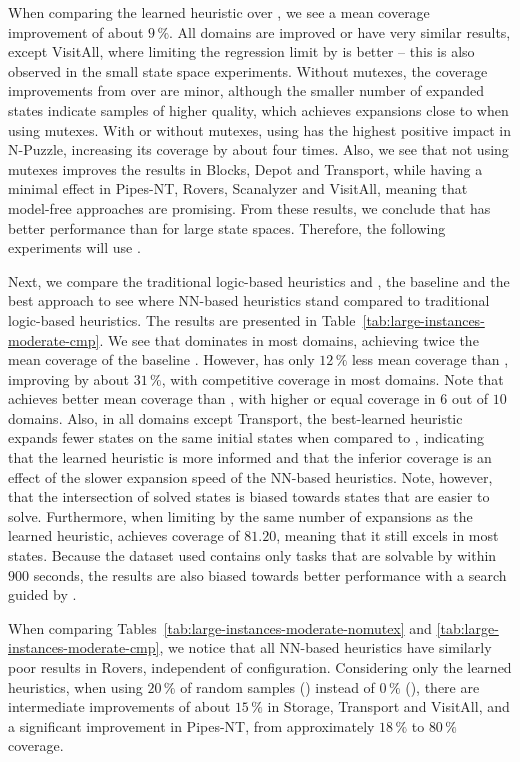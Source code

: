 

When comparing the learned heuristic \hnnbfsrwl{\meanfx} over \hnnbfsrwl{\facts}, we see a mean coverage improvement of about $9\,\%$. All domains are improved or have very similar results, except VisitAll, where limiting the regression limit by \facts is better -- this is also observed in the small state space experiments. Without mutexes, the coverage improvements from \hnnnomutexl{\meanfx} over \hnnnomutexl{\facts} are minor, although the smaller number of expanded states indicate samples of higher quality, which achieves expansions close to when using mutexes. With or without mutexes, using \meanfx has the highest positive impact in N-Puzzle, increasing its coverage by about four times. Also, we see that not using mutexes improves the results in Blocks, Depot and Transport, while having a minimal effect in Pipes-NT, Rovers, Scanalyzer and VisitAll, meaning that model-free approaches are promising. From these results, we conclude that \meanfx has better performance than \facts for large state spaces. Therefore, the following experiments will use \meanfx.

Next, we compare the traditional logic-based heuristics \hff and \hgc, the baseline \hnnbase and the best approach \hnnrs to see where NN-based heuristics stand compared to traditional logic-based heuristics. The results are presented in Table~\ref{tab:large-instances-moderate-cmp}.
We see that \hff dominates in most domains, achieving twice the mean coverage of the baseline \hnnbase. However, \hnnrs has only $12\,\%$ less mean coverage than \hff, improving \hnnbase by about $31\,\%$, with competitive coverage in most domains. Note that \hnnrs achieves better mean coverage than \hgc, with higher or equal coverage in $6$ out of $10$ domains. Also, in all domains except Transport, the best-learned heuristic expands fewer states on the same initial states when compared to \hff, indicating that the learned heuristic is more informed and that the inferior coverage is an effect of the slower expansion speed of the NN-based heuristics. Note, however, that the intersection of solved states is biased towards states that are easier to solve. Furthermore, when limiting \hff by the same number of expansions as the learned heuristic, \hff achieves coverage of $81.20$, meaning that it still excels in most states. Because the dataset used contains only tasks that are solvable by \hff within $900$ seconds, the results are also biased towards better performance with a search guided by \hff. 



When comparing Tables~\ref{tab:large-instances-moderate-nomutex} and \ref{tab:large-instances-moderate-cmp}, we notice that all NN-based heuristics have similarly poor results in Rovers, independent of configuration. Considering only the learned heuristics, when using $20\,\%$ of random samples (\hnnrs) instead of $0\,\%$ (\hnnbfsrwl{\meanfx}), there are intermediate improvements of about $15\,\%$ in Storage, Transport and VisitAll, and a significant improvement in Pipes-NT, from approximately $18\,\%$ to $80\,\%$ coverage.
